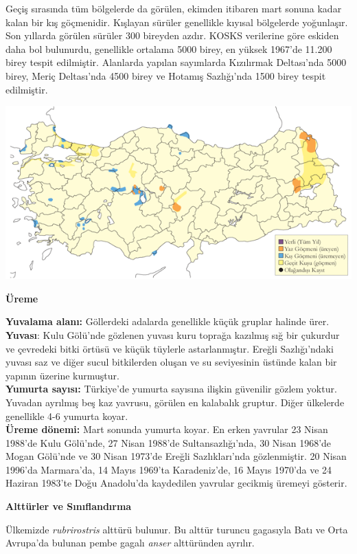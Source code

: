 \documentclass[
  letterpaper,
  DIV=11,
  numbers=noendperiod]{scrreprt}
\begin{document}
Geçiş sırasında tüm bölgelerde da görülen, ekimden itibaren mart sonuna
kadar kalan bir kış göçmenidir. Kışlayan sürüler genellikle kıyısal
bölgelerde yoğunlaşır. Son yıllarda görülen sürüler 300 bireyden azdır.
KOSKS verilerine göre eskiden daha bol bulunurdu, genellikle ortalama
5000 birey, en yüksek 1967'de 11.200 birey tespit edilmiştir. Alanlarda
yapılan sayımlarda Kızılırmak Deltası'nda 5000 birey, Meriç Deltası'nda
4500 birey ve Hotamış Sazlığı'nda 1500 birey tespit edilmiştir.

\includegraphics{images/harita_Page_002.png}

\textbf{Üreme}

\textbf{Yuvalama alanı:} Göllerdeki adalarda genellikle küçük gruplar
halinde ürer.\\
\textbf{Yuvası}: Kulu Gölü'nde gözlenen yuvası kuru toprağa kazılmış sığ
bir çukurdur ve çevredeki bitki örtüsü ve küçük tüylerle astarlanmıştır.
Ereğli Sazlığı'ndaki yuvası saz ve diğer sucul bitkilerden oluşan ve su
seviyesinin üstünde kalan bir yapının üzerine kurmuştur.\\
\textbf{Yumurta sayısı:} Türkiye'de yumurta sayısına ilişkin güvenilir
gözlem yoktur. Yuvadan ayrılmış beş kaz yavrusu, görülen en kalabalık
gruptur. Diğer ülkelerde genellikle 4-6 yumurta koyar.\\
\textbf{Üreme dönemi:} Mart sonunda yumurta koyar. En erken yavrular 23
Nisan 1988'de Kulu Gölü'nde, 27 Nisan 1988'de Sultansazlığı'nda, 30
Nisan 1968'de Mogan Gölü'nde ve 30 Nisan 1973'de Ereğli Sazlıkları'nda
gözlenmiştir. 20 Nisan 1996'da Marmara'da, 14 Mayıs 1969'ta
Karadeniz'de, 16 Mayıs 1970'da ve 24 Haziran 1983'te Doğu Anadolu'da
kaydedilen yavrular gecikmiş üremeyi gösterir.

\textbf{Alttürler ve Sınıflandırma}

Ülkemizde \emph{rubrirostris} alttürü bulunur. Bu alttür turuncu
gagasıyla Batı ve Orta Avrupa'da bulunan pembe gagalı \emph{anser}
alttüründen ayrılır.
\end{document}
